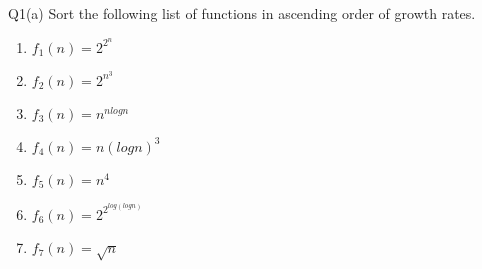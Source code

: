 \begin{problem}
  {Q1(a)}
    Sort the following list of functions in ascending order of growth rates.\\
      \begin{enumerate}
        \item $f_1(n) = 2^{2^n}$
        \item $f_2(n) = 2^{n^3}$
        \item $f_3(n) = n^{nlogn}$
        \item $f_4(n) = n(logn)^3$
        \item $f_5(n) = n^4$
        \item $f_6(n) = 2^{2^{log(logn)}}$
        \item $f_7(n) = \sqrt{n}$
      \end{enumerate}
\end{problem}
